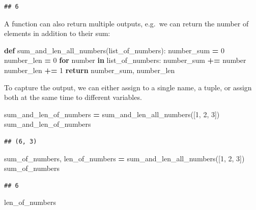 \documentclass[]{Nemilov}
\newenvironment{Shaded}{\begin{snugshade}}{\end{snugshade}}
\newcommand{\ControlFlowTok}[1]{\textcolor[rgb]{0.13,0.29,0.53}{\textbf{#1}}}
\newcommand{\DecValTok}[1]{\textcolor[rgb]{0.00,0.00,0.81}{#1}}
\newcommand{\KeywordTok}[1]{\textcolor[rgb]{0.13,0.29,0.53}{\textbf{#1}}}
\newcommand{\NormalTok}[1]{#1}
\newcommand{\OperatorTok}[1]{\textcolor[rgb]{0.81,0.36,0.00}{\textbf{#1}}}
\begin{document}
\begin{verbatim}
## 6
\end{verbatim}

A function can also return multiple outputs, e.g.~we can return the number of
elements in addition to their sum:

\begin{Shaded}
\begin{Highlighting}[]
\KeywordTok{def}\NormalTok{ sum_and_len_all_numbers(list_of_numbers):}
\NormalTok{    number_sum }\OperatorTok{=} \DecValTok{0}
\NormalTok{    number_len }\OperatorTok{=} \DecValTok{0}
    \ControlFlowTok{for}\NormalTok{ number }\KeywordTok{in}\NormalTok{ list_of_numbers:}
\NormalTok{        number_sum }\OperatorTok{+=}\NormalTok{ number}
\NormalTok{        number_len }\OperatorTok{+=} \DecValTok{1}
    \ControlFlowTok{return}\NormalTok{ number_sum, number_len}
\end{Highlighting}
\end{Shaded}

To capture the output, we can either assign to a single name, a tuple, or
assign both at the same time to different variables.

\begin{Shaded}
\begin{Highlighting}[]
\NormalTok{sum_and_len_of_numbers }\OperatorTok{=}\NormalTok{ sum_and_len_all_numbers([}\DecValTok{1}\NormalTok{, }\DecValTok{2}\NormalTok{, }\DecValTok{3}\NormalTok{])}
\NormalTok{sum_and_len_of_numbers}
\end{Highlighting}
\end{Shaded}

\begin{verbatim}
## (6, 3)
\end{verbatim}

\begin{Shaded}
\begin{Highlighting}[]
\NormalTok{sum_of_numbers, len_of_numbers }\OperatorTok{=}\NormalTok{ sum_and_len_all_numbers([}\DecValTok{1}\NormalTok{, }\DecValTok{2}\NormalTok{, }\DecValTok{3}\NormalTok{])}
\NormalTok{sum_of_numbers}
\end{Highlighting}
\end{Shaded}

\begin{verbatim}
## 6
\end{verbatim}

\begin{Shaded}
\begin{Highlighting}[]
\NormalTok{len_of_numbers}
\end{Highlighting}
\end{Shaded}
\end{document}
